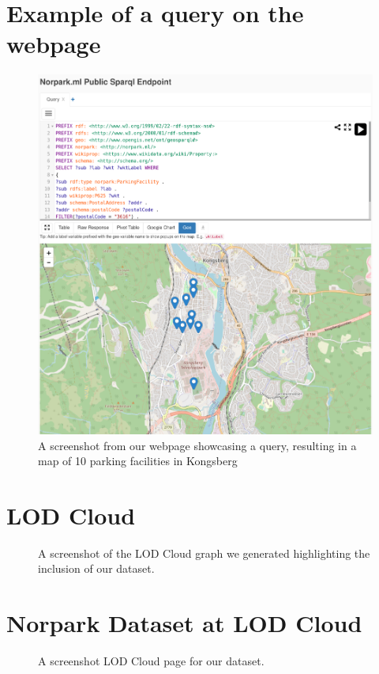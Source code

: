 \chapter{Example of a query on the webpage}
\label{appendix:query}
\begin{figure}[H]
	\centering
	\includegraphics[width=\linewidth]{figures/query-screenshot.png}
	\caption{A screenshot from our webpage showcasing a query, resulting in a map of 10 parking facilities in Kongsberg}
\end{figure}

\chapter{LOD Cloud}
\label{appendix:cloud}
\begin{figure}[H]
	\centering
	\caption{A screenshot of the LOD Cloud graph we generated highlighting the inclusion of our dataset. }
\end{figure}

\chapter{Norpark Dataset at LOD Cloud}
\label{appendix:lod-norpark}
\begin{figure}[H]
	\centering
	\caption{A screenshot LOD Cloud page for our dataset. }
\end{figure}

